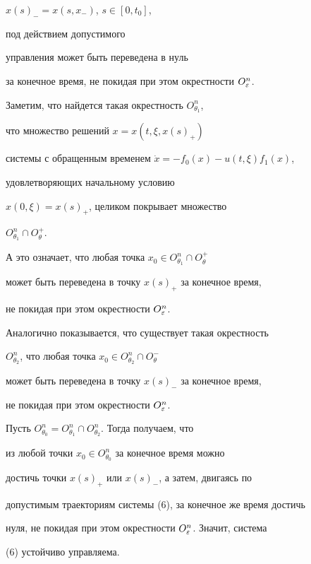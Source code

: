 \begin{pf}
$x(s)_{-}=x(s,x_{-})$, $s\in[0,t_0]$,


под действием допустимого


управления может быть переведена в нуль


за конечное время, не покидая при этом окрестности $O_{\varepsilon}^n$.





Заметим, что найдется такая окрестность $O_{\theta_1}^n$,


что множество решений $x=x(t,\xi,x(s)_{+})$


системы с обращенным временем $\Dot x = -f_0(x) - u(t,\xi)f_1(x)$,


удовлетворяющих начальному условию


$x(0,\xi)=x(s)_{+}$, целиком покрывает множество


$O_{\theta_1}^n\cap O_{\theta}^{+}$.


А это означает, что любая точка $x_0\in O_{\theta_1}^n\cap O_{\theta}^{+}$


может быть переведена в точку $x(s)_{+}$ за конечное время,


не покидая при этом окрестности $O_{\varepsilon}^n$.


Аналогично показывается, что существует такая окрестность


$O_{\theta_2}^n$, что любая точка $x_0\in O_{\theta_2}^n\cap O_{\theta}^{-}$


может быть переведена в точку $x(s)_{-}$ за конечное время,


не покидая при этом окрестности $O_{\varepsilon}^n$.


Пусть $O_{\theta_0}^n=O_{\theta_1}^n\cap O_{\theta_2}^n$. Тогда получаем, что


из любой точки $x_0\in O_{\theta_0}^n$ за конечное время можно


достичь точки $x(s)_{+}$ или $x(s)_{-}$, а затем, двигаясь по


допустимым траекториям системы (6), за конечное же время достичь


нуля, не покидая при этом окрестности $O_{\varepsilon}^n$. Значит, система


(6) устойчиво управляема.


\end{pf}





